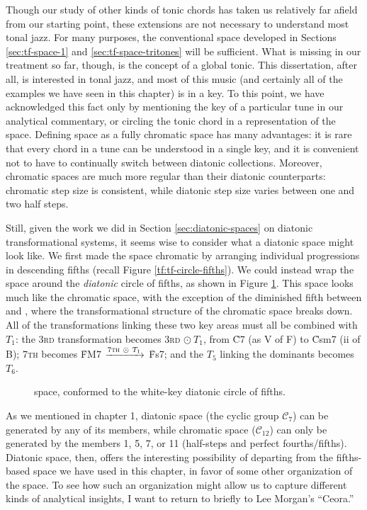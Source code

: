 {Though our study of other kinds of tonic chords has taken us relatively far
afield from our starting point, these extensions are not necessary to
understand most tonal jazz. For many purposes, the conventional space
developed in Sections \ref{sec:tf-space-1} and \ref{sec:tf-space-tritones}
will be sufficient. What is missing in our treatment so far, though, is the
concept of a global tonic. This dissertation, after all, is interested in
tonal jazz, and most of this music (and certainly all of the examples we have
seen in this chapter) is in a key. To this point, we have acknowledged
this fact only by mentioning the key of a particular tune in our analytical
commentary, or circling the tonic chord in a representation of the space.
Defining \tf space as a fully chromatic space has many advantages: it is rare
that every chord in a tune can be understood in a single key, and it is
convenient not to have to continually switch between diatonic collections.
Moreover, chromatic spaces are much more regular than their diatonic
counterparts: chromatic step size is consistent, while diatonic step size
varies between one and two half steps.

Still, given the work we did in Section \ref{sec:diatonic-spaces} on diatonic
transformational systems, it seems wise to consider what a diatonic \tf space
might look like. We first made the space chromatic by arranging individual
\tfo progressions in descending fifths (recall Figure
\ref{tf:tf-circle-fifths}). We could instead wrap the space around the
\emph{diatonic} circle of fifths, as shown in Figure
\ref{tfe:tf-diatonic-fifths}. This space looks much like the chromatic space,
with the exception of the diminished fifth between  and , where the
transformational structure of the chromatic space breaks down.
All of the transformations linking these two key areas must all be combined
with $T_1$: the \textsc{3rd} transformation becomes \textsc{3rd} $\odot\ T_1$,
from \h{C7} (as V of F) to \h{Csm7} (ii of B); \textsc{7th}
becomes \h{FM7} $\xrightarrow{7\text{\textsc{th}}\ \odot\ T_1}$ \h{Fs7}; and the
$T_5$ linking the dominants becomes $T_6$.

\begin{figure}[tbp]
  \caption{\tf space, conformed to the white-key diatonic circle of fifths.}
  \label{tfe:tf-diatonic-fifths}
\end{figure}

As we mentioned in chapter 1, diatonic space (the cyclic group
$\mathcal{C}_7$) can be generated by any of its members, while chromatic space
($\mathcal{C}_{12}$) can only be generated by the members 1, 5, 7, or 11
(half-steps and perfect fourths/fifths). Diatonic \tf space, then, offers the
interesting possibility of departing from the fifths-based space we have used
in this chapter, in favor of some other organization of the space. To see how
such an organization might allow us to capture different kinds of analytical
insights, I want to return to briefly to Lee Morgan's ``Ceora.''

}
